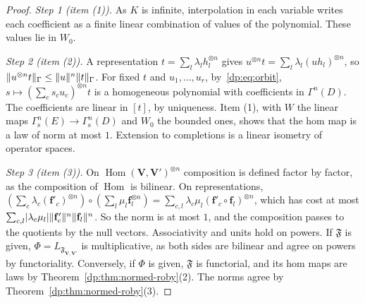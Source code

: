 \begin{proof}
\emph{Step 1 (item (1)).} As $K$ is infinite, interpolation in each variable writes each coefficient as a finite linear combination of values of the polynomial. These values lie in $W_0$.

\emph{Step 2 (item (2)).} A representation $t=\sum_l\lambda_lh_l^{\otimes n}$ gives $u^{\otimes n}t=\sum_l\lambda_l(uh_l)^{\otimes n}$, so $\lVert u^{\otimes n}t\rVert_\Gamma\le\lVert u\rVert^n\lVert t\rVert_\Gamma$. For fixed $t$ and $u_1,\dots,u_r$, by~\eqref{dp:eq:orbit}, $s\mapsto(\sum_cs_cu_c)^{\otimes n}t$ is a homogeneous polynomial with coefficients in $\Gamma^n(D)$. The coefficients are linear in $[t]$, by uniqueness. Item (1), with $W$ the linear maps $\Gamma^n_{\mathrm s}(E)\to\Gamma^n_{\mathrm s}(D)$ and $W_0$ the bounded ones, shows that the hom map is a law of norm at most $1$. Extension to completions is a linear isometry of operator spaces.

\emph{Step 3 (item (3)).} On $\operatorname{Hom}(\mathbf V,\mathbf V')^{\otimes n}$ composition is defined factor by factor, as the composition of $\operatorname{Hom}$ is bilinear. On representations, $(\sum_c\lambda_c(\mathbf f'_c)^{\otimes n})\circ(\sum_l\mu_l\mathbf f_l^{\otimes n})=\sum_{c,l}\lambda_c\mu_l(\mathbf f'_c\circ\mathbf f_l)^{\otimes n}$, which has cost at most $\sum_{c,l}\lvert \lambda_c\mu_l\rvert\lVert \mathbf f'_c\rVert^n\lVert \mathbf f_l\rVert^n$. So the norm is at most $1$, and the composition passes to the quotients by the null vectors. Associativity and units hold on powers. If $\mathfrak F$ is given, $\Phi=L_{\mathfrak F_{\mathbf V,\mathbf V'}}$ is multiplicative, as both sides are bilinear and agree on powers by functoriality. Conversely, if $\Phi$ is given, $\mathfrak F$ is functorial, and its hom maps are laws by Theorem~\ref{dp:thm:normed-roby}(2). The norms agree by Theorem~\ref{dp:thm:normed-roby}(3).
\end{proof}

